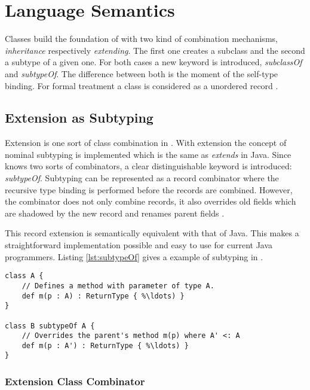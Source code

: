 \section{Language Semantics}
Classes build the foundation of \ooplss with two kind of combination mechanisms, 
\emph{inheritance} respectively \emph{extending}. The
first one creates a subclass and the second a subtype of a given
one. For both cases a new keyword is introduced, \emph{subclassOf}
and \emph{subtypeOf}. The difference between both is the moment of
the self-type binding. For formal treatment a class is considered as a
unordered record \cite{simons_theory_2002-1}.

\subsection{Extension as Subtyping}
Extension is one sort of class combination in \ooplss. With extension the concept
of nominal subtyping is implemented which is the same as \emph{extends} in Java.
Since \ooplss knows two sorts of combinators, a clear distinguishable keyword is
introduced: \emph{subtypeOf}. Subtyping can be represented as a record combinator
where the recursive type binding is performed before the records are combined.
However, the combinator does not only combine records, it also overrides old
fields which are shadowed by the new record and renames parent
fields \cite{simons_theory_2003-2}.

This record extension is semantically equivalent with that of Java. This
makes a straightforward implementation possible and easy to use for
current Java programmers. Listing \ref{lst:subtypeOf} gives a example
of subtyping in \ooplss.

\begin{lstlisting}[float,language=ooplss,caption=Subtyping in \ooplss,label=lst:subtypeOf]
class A {
	// Defines a method with parameter of type A.
	def m(p : A) : ReturnType { %\ldots) }
}

class B subtypeOf A {
	// Overrides the parent's method m(p) where A' <: A
	def m(p : A') : ReturnType { %\ldots) }
}
\end{lstlisting}


\subsubsection{Extension Class Combinator}

